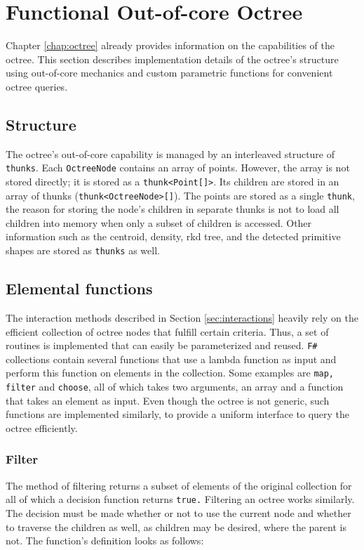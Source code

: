 \section{Functional Out-of-core Octree}
\label{sec:funcOctree}

Chapter \ref{chap:octree} already provides information on the capabilities of the octree. This section describes implementation details of the octree's structure using out-of-core mechanics and custom parametric functions for convenient octree queries. 


\subsection{Structure}

The octree's out-of-core capability is managed by an interleaved structure of \verb|thunks|. Each \verb|OctreeNode| contains an array of points. However, the array is not stored directly; it is stored as a \verb|thunk<Point[]>|. Its children are stored in an array of thunks (\verb|thunk<OctreeNode>[]|). The points are stored as a single \verb|thunk|, the reason for storing the node's children in separate thunks is not to load all children into memory when only a subset of children is accessed. Other information such as the centroid, density, rkd tree, and the detected primitive shapes are stored as \verb|thunks| as well. 


\subsection{Elemental functions}

The interaction methods described in Section \ref{sec:interactions} heavily rely on the efficient collection of octree nodes that fulfill certain criteria. Thus, a set of routines is implemented that can easily be parameterized and reused. \verb|F#| collections contain several functions that use a lambda function as input and perform this function on elements in the collection. Some examples are \verb|map, filter| and \verb|choose|, all of which takes two arguments, an array and a function that takes an element as input. Even though the octree is not generic, such functions are implemented similarly, to provide a uniform interface to query the octree efficiently. 


\subsubsection{Filter}
The method of filtering returns a subset of elements of the original collection for all of which a decision function returns \verb|true.|
Filtering an octree works similarly. The decision must be made whether or not to use the current node and whether to traverse the children as well, as children may be desired, where the parent is not. 
The function's definition looks as follows: 

